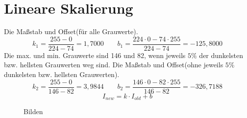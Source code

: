 \documentclass[12pt]{article}
\begin{document}
	\pagestyle{main}

\section{Lineare Skalierung}
Die Maßstab und Offset(für alle Grauwerte). \newline
\begin{equation*}
k_{1}=\frac{255-0}{224-74}=1,7000\ \ \ \ \ \ \ \ \ b_{1}=\frac{224 \cdot 0-74 \cdot 255}{224-74}=-125,8000    
\end{equation*}
Die max. und min. Grauwerte sind 146 und 82, wenn jeweils $5\%$ der dunkelsten bzw. hellsten Grauwerten weg sind. Die Maßstab und Offset(ohne jeweils $5\%$ dunkelsten bzw. hellsten Grauwerten).
\begin{equation*}
k_{2}=\frac{255-0}{146-82}=3,9844\ \ \ \ \ \ \ \ \ b_{2}=\frac{146 \cdot 0-82 \cdot 255}{146-82}=-326,7188    
\end{equation*}
\begin{equation*}
I_{new}=k \cdot I_{old} + b
\end{equation*}
\begin{figure}[ht]\centering
	\caption{Bilden}
\end{figure}
\end{document}
